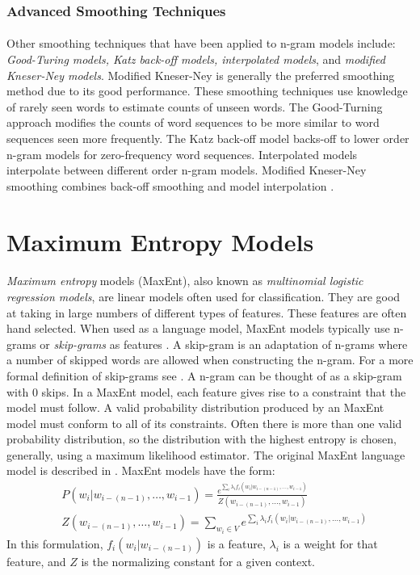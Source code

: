\subsubsection{Advanced Smoothing Techniques}
\paragraph{}
 Other smoothing techniques that have been applied to n-gram models include: \emph{Good-Turing models, Katz back-off models, interpolated models}, and \emph{modified Kneser-Ney models}. Modified Kneser-Ney is generally the preferred smoothing method due to its good performance. These smoothing techniques use knowledge of rarely seen words to estimate counts of unseen words. The Good-Turning approach modifies the counts of word sequences to be more similar to word sequences seen more frequently. The Katz back-off model backs-off to lower order n-gram models for zero-frequency word sequences. Interpolated models interpolate between different order n-gram models. Modified Kneser-Ney smoothing combines back-off smoothing and model interpolation \cite{Jurafsky2009}.

\section{Maximum Entropy  Models}
\paragraph{}
\emph{Maximum entropy} models (MaxEnt), also known as \emph{multinomial logistic regression models}, are linear models often used for classification. They are good at taking in large numbers of different types of features. These features are often hand selected. When used as a language model, MaxEnt models typically use n-grams or \emph{skip-grams} as features \cite{Mikolov2012}. A skip-gram is an adaptation of n-grams where a number of skipped words are allowed when constructing the n-gram. For a more formal definition of skip-grams see \cite{Guthrie2006}. A n-gram can be thought of as a skip-gram with 0 skips. In a MaxEnt model, each feature gives rise to a constraint that the model must follow. A valid probability distribution produced by an MaxEnt model must conform to all of its constraints. Often there is more than one valid probability distribution, so the distribution with the highest entropy is chosen, generally, using a maximum likelihood estimator. The original MaxEnt language model is described in \cite{Rosenfeld1994}.
MaxEnt models have the form:
\begin{align}
&P(w_i | w_{i-(n-1)},\dots, w_{i-1}) = \frac{e^{\sum_i \lambda_i f_i(w_i | w_{i-(n-1)},\dots, w_{i-1})}}{Z(w_{i-(n-1)},
\dots, w_{i-1})} \label{eq:maxent}
\\
&Z(w_{i-(n-1)},\dots, w_{i-1}) = \sum_{w_i \in V} e^{\sum_i \lambda_i f_i(w_i | w_{i-(n-1)},\dots, w_{i-1})} \nonumber
\end{align}
In this formulation, $f_i(w_i | w_{i-(n-1)})$ is a feature, $\lambda_i$ is a weight for that feature, and $Z$ is the normalizing constant for a given context.
